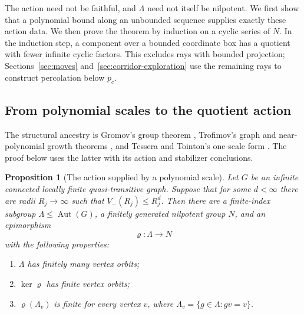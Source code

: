 \documentclass[11pt]{article}
\newtheorem{proposition}[theorem]{Proposition}
\theoremstyle{definition}
\begin{document}
The action need not be faithful, and \(\Lambda\) need not itself be
nilpotent. We first show that a polynomial bound along an unbounded
sequence supplies exactly these action data. We then prove the theorem
by induction on a cyclic series of \(N\). In the induction step, a
component over a bounded coordinate box has a quotient with fewer
infinite cyclic factors. This excludes rays with bounded projection;
Sections~\ref{sec:moves} and~\ref{sec:corridor-exploration} use the
remaining rays to construct percolation below \(p_c\).

\subsection{From polynomial scales to the quotient action}

The structural ancestry is Gromov's group theorem \cite{Gromov1981},
Trofimov's graph and near-polynomial growth theorems
\cite{Trofimov1985,Trofimov2003}, and Tessera and Tointon's one-scale
form \cite{TesseraTointon2021}. The proof below uses the latter with
its action and stabilizer conclusions.

\begin{proposition}[The action supplied by a polynomial scale]
\label{prop:nilpotent-model}
Let $G$ be an infinite connected locally finite quasi-transitive graph.
Suppose that for some $d<\infty$ there are radii $R_j\to\infty$ such that
$V_-(R_j)\le R_j^d$. Then there are a finite-index subgroup
$\Lambda\le\operatorname{Aut}(G)$, a finitely generated nilpotent group
$N$, and an epimorphism
\[
 \varrho:\Lambda\longrightarrow N
\]
with the following properties:
\begin{enumerate}
 \item $\Lambda$ has finitely many vertex orbits;
 \item $\ker\varrho$ has finite vertex orbits;
 \item $\varrho(\Lambda_v)$ is finite for every vertex $v$, where
 $\Lambda_v=\{g\in\Lambda:gv=v\}$.
\end{enumerate}
\end{proposition}
\end{document}
